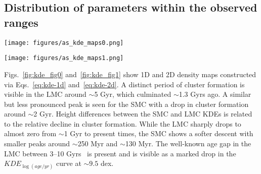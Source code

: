 \documentclass[draft]{aa}
\renewcommand{\includegraphics}[2][]{}
\begin{document}

\subsection{Distribution of parameters within the observed ranges}
\label{ssec:dist_ranges}

\begin{figure*}
\texttt{[image: figures/as\_kde\_maps0.png]}
\caption{Adaptive Gaussian KDEs for age, metallicity, and mass. The top and right
plots are 1D KDEs; center plots are 2D KDEs. Observed clusters are plotted as
red and blue stars for the S/LMC, respectively. Sizes are scaled according to
the radius of each cluster. A small scatter is introduced for clarity.}
\label{fig:kde_fig0}
\end{figure*}

\begin{figure*}
\texttt{[image: figures/as\_kde\_maps1.png]}
\caption{Same as Fig.~\ref{fig:kde_fig0} for $E_{(B-V)}$ and distance
modulus.}
\label{fig:kde_fig1}
\end{figure*}

Figs.~\ref{fig:kde_fig0} and~\ref{fig:kde_fig1} show 1D and 2D density maps
constructed via Eqs.~\ref{eq:kde-1d} and~\ref{eq:kde-2d}.
%
%
A distinct period of cluster formation is visible in the LMC around ${\sim}$5
Gyr, which culminated ${\sim}$1.3 Gyrs ago. A similar but less
pronounced peak is seen for the SMC with a drop in cluster formation around
${\sim}$2 Gyr.
Height differences between the SMC and LMC KDEs is related to the relative
decline in cluster formation. While the LMC sharply drops to almost zero from
${\sim}$1 Gyr to present times, the SMC shows a softer descent with smaller
peaks around ${\sim}$250 Myr and ${\sim}$130 Myr.
The well-known age gap in the LMC between 3--10 Gyrs~\citep{Balbinot_2010}
is present and is visible as a marked drop in the $KDE_{\log(age/yr)}$ curve at
$\sim9.5$ dex.
\end{document}
